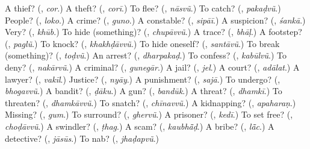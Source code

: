 \begin{tcolorbox}[breakable,colback=teal!4,colframe=teal!35!black,title={Before you move on}]
A thief? (\textbf{}, \emph{cor}.) A theft? (\textbf{}, \emph{corī}.) To flee? (\textbf{}, \emph{nāsvũ}.) To catch? (\textbf{}, \emph{pakaḍvũ}.) People? (\textbf{}, \emph{loko}.) A crime? (\textbf{}, \emph{guno}.) A constable? (\textbf{}, \emph{sipāī}.) A suspicion? (\textbf{}, \emph{śankā}.) Very? (\textbf{}, \emph{khūb}.) To hide (something)? (\textbf{}, \emph{chupāvvũ}.) A trace? (\textbf{}, \emph{bhāḷ}.) A footstep? (\textbf{}, \emph{paglũ}.) To knock? (\textbf{}, \emph{khakhḍāvvũ}.) To hide oneself? (\textbf{}, \emph{santāvũ}.) To break (something)? (\textbf{}, \emph{toḍvũ}.) An arrest? (\textbf{}, \emph{dharpakaḍ}.) To confess? (\textbf{}, \emph{kabūlvũ}.) To deny? (\textbf{}, \emph{nakārvũ}.) A criminal? (\textbf{}, \emph{gunegār}.) A jail? (\textbf{}, \emph{jel}.) A court? (\textbf{}, \emph{adālat}.) A lawyer? (\textbf{}, \emph{vakīl}.) Justice? (\textbf{}, \emph{nyāy}.) A punishment? (\textbf{}, \emph{sajā}.) To undergo? (\textbf{}, \emph{bhogavvũ}.) A bandit? (\textbf{}, \emph{ḍāku}.) A gun? (\textbf{}, \emph{bandūk}.) A threat? (\textbf{}, \emph{dhamkī}.) To threaten? (\textbf{}, \emph{dhamkāvvũ}.) To snatch? (\textbf{}, \emph{chīnavvũ}.) A kidnapping? (\textbf{}, \emph{apaharaṇ}.) Missing? (\textbf{}, \emph{gum}.) To surround? (\textbf{}, \emph{ghervũ}.) A prisoner? (\textbf{}, \emph{kedī}.) To set free? (\textbf{}, \emph{choḍāvvũ}.) A swindler? (\textbf{}, \emph{ṭhag}.) A scam? (\textbf{}, \emph{kaubhā̃ḍ}.) A bribe? (\textbf{}, \emph{lā̃c}.) A detective? (\textbf{}, \emph{jāsūs}.) To nab? (\textbf{}, \emph{jhaḍapvũ}.)
\end{tcolorbox}
